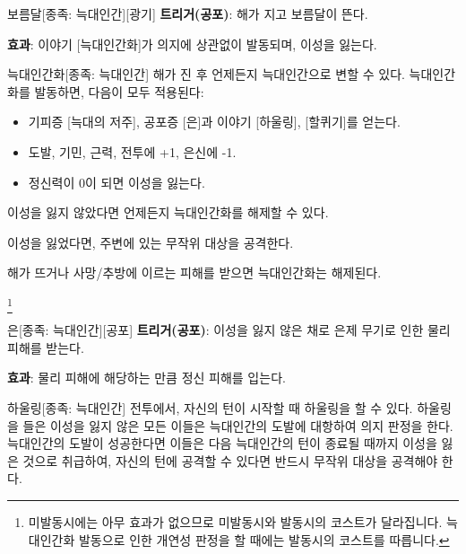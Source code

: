 \documentclass{report}
\begin{document}
	\begin{story}{보름달}{[종족: 늑대인간][광기]}
		\textbf{트리거(공포)}: 해가 지고 보름달이 뜬다.
		
		\textbf{효과}: 이야기 [늑대인간화]가 의지에 상관없이 발동되며, 이성을 잃는다.
		
		\smallskip
		
	\end{story}
	
	\begin{story}{늑대인간화}{[종족: 늑대인간]}
		해가 진 후 언제든지 늑대인간으로 변할 수 있다. 늑대인간화를 발동하면, 다음이 모두 적용된다:
		\begin{itemize}
			\item 기피증 [늑대의 저주], 공포증 [은]과 이야기 [하울링], [할퀴기]를 얻는다.
			\item 도발, 기민, 근력, 전투에 +1, 은신에 -1.
			\item 정신력이 0이 되면 이성을 잃는다.
		\end{itemize}
		
		이성을 잃지 않았다면 언제든지 늑대인간화를 해제할 수 있다.
		
		이성을 잃었다면, 주변에 있는 무작위 대상을 공격한다.
		
		\smallskip
		
		해가 뜨거나 사망/추방에 이르는 피해를 받으면 늑대인간화는 해제된다.
		
		\smallskip
		
		\footnote{미발동시에는 아무 효과가 없으므로 미발동시와 발동시의 코스트가 달라집니다. 늑대인간화 발동으로 인한 개연성 판정을 할 때에는 발동시의 코스트를 따릅니다.}
	\end{story}
	
	\begin{story}{은}{[종족: 늑대인간][공포]}
		\textbf{트리거(공포)}: 이성을 잃지 않은 채로 은제 무기로 인한 물리 피해를 받는다.
		
		\textbf{효과}: 물리 피해에 해당하는 만큼 정신 피해를 입는다.
		
		\smallskip
		
	\end{story}
	
	\begin{story}{하울링}{[종족: 늑대인간]}
		전투에서, 자신의 턴이 시작할 때 하울링을 할 수 있다. 하울링을 들은 이성을 잃지 않은 모든 이들은 늑대인간의 도발에 대항하여 의지 판정을 한다. 늑대인간의 도발이 성공한다면 이들은 다음 늑대인간의 턴이 종료될 때까지 이성을 잃은 것으로 취급하여, 자신의 턴에 공격할 수 있다면 반드시 무작위 대상을 공격해야 한다.
		
		\smallskip
		
	\end{story}
	
\end{document}
